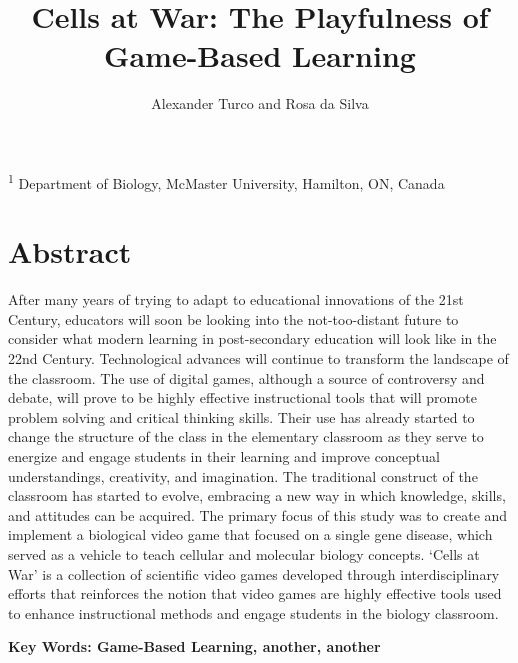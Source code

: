 \documentclass[10pt]{article}
\title{\sc Cells at War: The Playfulness of Game-Based Learning}
\author{\sc Alexander Turco and Rosa da Silva}
\begin{document}

\onecolumn
                        \maketitle

\thispagestyle{empty}
\noindent \textsuperscript{1} Department of Biology, McMaster University, Hamilton, ON, Canada

\newpage
\tableofcontents
\newpage

\section{Abstract}

After many years of trying to adapt to educational innovations of the 21st Century, educators will soon be looking into the not-too-distant future to consider what modern learning in post-secondary education will look like in the 22nd Century. Technological advances will continue to transform the landscape of the classroom. The use of digital games, although a source of controversy and debate, will prove to be highly effective instructional tools that will promote problem solving and critical thinking skills. Their use has already started to change the structure of the class in the elementary classroom as they serve to energize and engage students in their learning and improve conceptual understandings, creativity, and imagination. The traditional construct of the classroom has started to evolve, embracing a new way in which knowledge, skills, and attitudes can be acquired. The primary focus of this study was to create and implement a biological video game that focused on a single gene disease, which served as a vehicle to teach cellular and molecular biology concepts. ‘Cells at War’ is a collection of scientific video games developed through interdisciplinary efforts that reinforces the notion that video games are highly effective tools used to enhance instructional methods and engage students in the biology classroom.

\bigskip

\textbf{Key Words: Game-Based Learning, another, another \vspace{15pt}}
\end{document}
